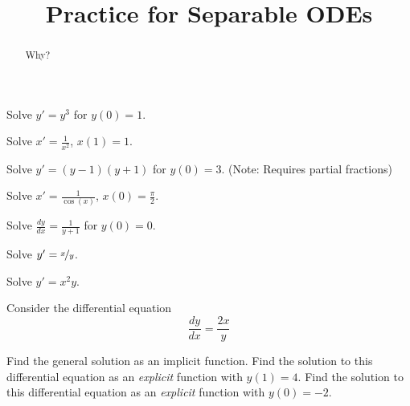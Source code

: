 \documentclass{ximera}
\title{Practice for Separable ODEs}
\begin{document}
\begin{abstract}
    Why?
\end{abstract}
\maketitle


\begin{exercise}
    Solve $y' = y^3$ for $y(0)=1$.
\end{exercise}

\begin{exercise}%
    Solve $x' = \frac{1}{x^2}$, $x(1)=1$.
\end{exercise}


\begin{exercise}
    Solve $y' = (y-1)(y+1)$ for $y(0)=3$. (Note: Requires partial fractions)
\end{exercise}

\begin{exercise}%
    Solve $x' = \frac{1}{\cos(x)}$, $x(0)=\frac{\pi}{2}$.
\end{exercise}


\begin{exercise}
    Solve $\frac{dy}{dx} = \frac{1}{y+1}$ for $y(0)=0$.
\end{exercise}

\begin{exercise}
    Solve $y' = \nicefrac{x}{y}$.
\end{exercise}

\begin{exercise}
    Solve $y' = x^2y$.
\end{exercise}

\begin{exercise}%
    Consider the differential equation \[ \frac{dy}{dx} = \frac{2x}{y} \]
    \begin{tasks}
        \task Find the general solution as an implicit function.
        \task Find the solution to this differential equation as an \emph{explicit} function with $y(1) = 4$.
        \task Find the solution to this differential equation as an \emph{explicit} function with $y(0) = -2$. 
    \end{tasks}
\end{exercise}
\end{document}
